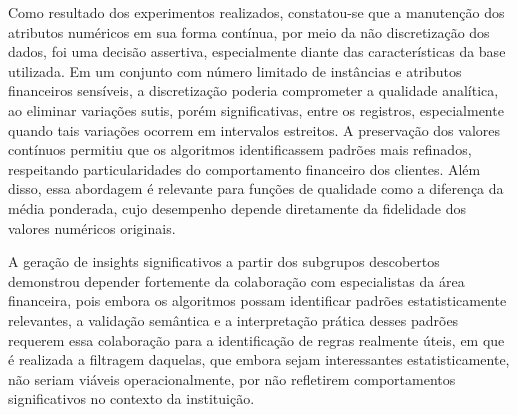 \documentclass[12pt]{article}
\begin{document}
Como resultado dos experimentos realizados, constatou-se que a manutenção dos atributos numéricos em sua forma contínua, por meio da não discretização dos dados, foi uma decisão assertiva, especialmente diante das características da base utilizada. Em um conjunto com número limitado de instâncias e atributos financeiros sensíveis, a discretização poderia comprometer a qualidade analítica, ao eliminar variações sutis, porém significativas, entre os registros, especialmente quando tais variações ocorrem em intervalos estreitos. A preservação dos valores contínuos permitiu que os algoritmos identificassem padrões mais refinados, respeitando particularidades do comportamento financeiro dos clientes. Além disso, essa abordagem é relevante para funções de qualidade como a diferença da média ponderada, cujo desempenho depende diretamente da fidelidade dos valores numéricos originais.

A geração de insights significativos a partir dos subgrupos descobertos demonstrou depender fortemente da colaboração com especialistas da área financeira, pois embora os algoritmos possam identificar padrões estatisticamente relevantes, a validação semântica e a interpretação prática desses padrões requerem essa colaboração para a identificação de regras realmente úteis, em que é realizada a filtragem daquelas, que embora sejam interessantes estatisticamente, não seriam viáveis operacionalmente, por não refletirem comportamentos significativos no contexto da instituição.



\end{document}
